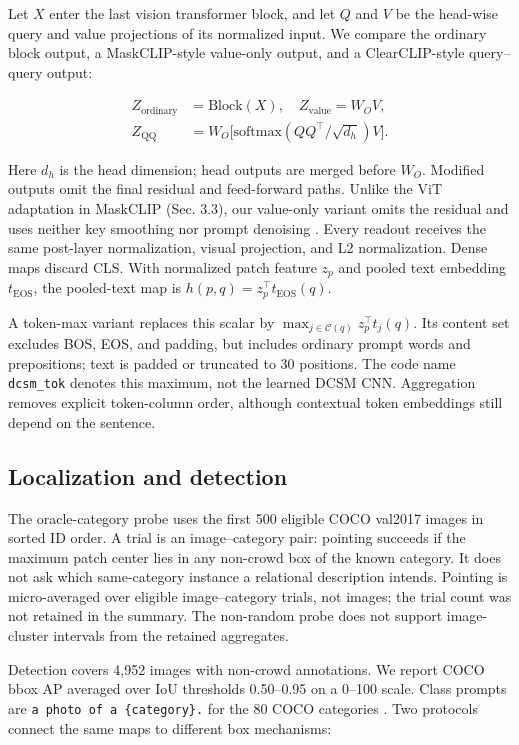 \documentclass[10pt,twocolumn,letterpaper]{article}
\begin{document}
Let \(X\) enter the last vision transformer block, and let \(Q\) and
\(V\) be the head-wise query and value projections of its normalized
input. We compare the ordinary block output, a MaskCLIP-style value-only
output, and a ClearCLIP-style query--query output:

\[
\begin{aligned}
Z_{\mathrm{ordinary}}&=\mathrm{Block}(X),\quad Z_{\mathrm{value}}=W_O V,\\
Z_{\mathrm{QQ}}&=W_O\big[\mathrm{softmax}(QQ^\top/\sqrt{d_h})V\big].
\end{aligned}
\]

Here \(d_h\) is the head dimension; head outputs are merged before
\(W_O\). Modified outputs omit the final residual and feed-forward
paths. Unlike the ViT adaptation in MaskCLIP (Sec. 3.3), our value-only
variant omits the residual and uses neither key smoothing nor prompt
denoising \citep{zhou2021maskclip}. Every readout receives the same
post-layer normalization, visual projection, and L2 normalization. Dense
maps discard CLS. With normalized patch feature \(z_p\) and pooled text
embedding \(t_{\mathrm{EOS}}\), the pooled-text map is
\(h(p,q)=z_p^\top t_{\mathrm{EOS}}(q)\).

A token-max variant replaces this scalar by
\(\max_{j\in\mathcal C(q)}z_p^\top t_j(q)\). Its content set excludes
BOS, EOS, and padding, but includes ordinary prompt words and
prepositions; text is padded or truncated to 30 positions. The code name
\texttt{dcsm\_tok} denotes this maximum, not the learned DCSM CNN.
Aggregation removes explicit token-column order, although contextual
token embeddings still depend on the sentence.

\subsection{Localization and
detection}\label{localization-and-detection}

The oracle-category probe uses the first 500 eligible COCO val2017
images in sorted ID order. A trial is an image--category pair: pointing
succeeds if the maximum patch center lies in any non-crowd box of the
known category. It does not ask which same-category instance a
relational description intends. Pointing is micro-averaged over eligible
image--category trials, not images; the trial count was not retained in
the summary. The non-random probe does not support image-cluster
intervals from the retained aggregates.

Detection covers 4,952 images with non-crowd annotations. We report COCO
bbox AP averaged over IoU thresholds 0.50--0.95 on a 0--100 scale. Class
prompts are \texttt{a\ photo\ of\ a\ \{category\}.} for the 80 COCO
categories \citep{lin2014coco}. Two protocols connect the same maps to
different box mechanisms:
\end{document}
